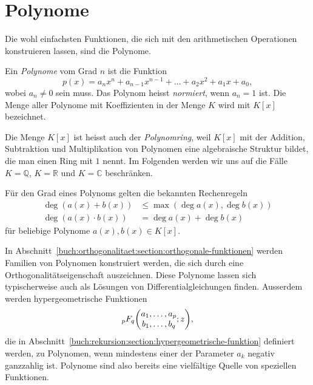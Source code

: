 %
%
%
\section{Polynome
\label{buch:potenzen:section:polynome}}
Die wohl einfachsten Funktionen, die sich mit den arithmetischen
Operationen konstruieren lassen, sind die Polynome.

\begin{definition}
%
Ein {\em Polynome} vom Grad $n$ ist die Funktion
\[
p(x) = a_nx^n + a_{n-1}x^{n-1} + \dots + a_2x^2 + a_1x + a_0,
\]
wobei $a_n\ne 0$ sein muss.
Das Polynom heisst {\em normiert}, wenn $a_n=1$ ist.
%
%
%
Die Menge aller Polynome mit Koeffizienten in der Menge $K$ wird mit
$K[x]$ bezeichnet.
\end{definition}

Die Menge $K[x]$ ist heisst auch der {\em Polynomring}, weil $K[x]$
%
mit der Addition, Subtraktion und Multiplikation von Polynomen eine
algebraische Struktur bildet, die man einen Ring mit $1$ nennt.
%
Im Folgenden werden wir uns auf die Fälle $K=\mathbb{Q}$, $K=\mathbb{R}$
und $K=\mathbb{C}$ beschränken.

Für den Grad eines Polynoms gelten die bekannten Rechenregeln
\begin{align*}
\deg (a(x) + b(x)) &\le \operatorname{max}(\deg a(x), \deg b(x))
\\
\deg (a(x)\cdot b(x)) &=\deg a(x) + \deg b(x)
\end{align*}
für beliebige Polynome $a(x),b(x)\in K[x]$.

In Abschnitt~\ref{buch:orthogonalitaet:section:orthogonale-funktionen} werden
Familien von Polynomen konstruiert werden, die sich durch eine
Orthogonalitätseigenschaft auszeichnen.
Diese Polynome lassen sich typischerweise auch als Lösungen von
Differentialgleichungen finden.
Ausserdem werden hypergeometrische Funktionen
\[
\mathstrut_pF_q\biggl(
\begin{matrix}a_1,\dots,a_p\\b_1,\dots,b_q\end{matrix};z
\biggr),
\] die in
Abschnitt~\ref{buch:rekursion:section:hypergeometrische-funktion}
definiert werden, zu Polynomen, wenn mindestens einer der
Parameter $a_k$ negativ ganzzahlig ist.
Polynome sind also bereits eine vielfältige Quelle von speziellen
Funktionen.


